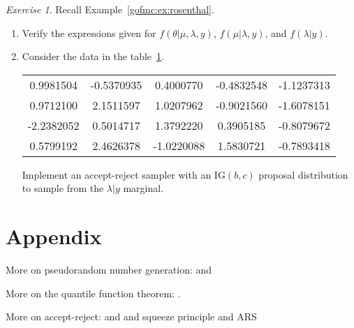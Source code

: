 \documentclass[12pt]{article}
\theoremstyle{plain}
\theoremstyle{definition}
\theoremstyle{remark}
\newtheorem{hw}{Exercise}[section]
\begin{document}
\begin{hw} \label{gofmc:hw:rosenthal}
Recall Example~\ref{gofmc:ex:rosenthal}.  
\begin{enumerate}
\item Verify the expressions given for $f(\theta| \mu, \lambda, y)$,
  $f(\mu | \lambda, y)$, and  
$f(\lambda |y)$. 
\item Consider the data in the table~\ref{gofmc:tab:rosenthal}.
\begin{table}
\begin{center}
\begin{tabular}{ccccc} 
  \hline
0.9981504 & -0.5370935 & 0.4000770 & -0.4832548 & -1.1237313 \\
0.9712100 & 2.1511597 & 1.0207962 & -0.9021560 & -1.6078151 \\
-2.2382052 & 0.5014717 & 1.3792220 & 0.3905185 & -0.8079672 \\
0.5799192 & 2.4626378 & -1.0220088 & 1.5830721 & -0.7893418 \\
  \hline
\end{tabular}
\label{gofmc:tab:rosenthal}
\end{center}
\end{table} 
Implement an accept-reject sampler with an $\text{IG}(b,c)$ proposal
distribution to sample from the $\lambda |y$ marginal.
\end{enumerate}
\end{hw}


\newpage

\section*{Appendix}

More on pseudorandom number generation: \citet{devr:1986} and \citet{fish:1996}

More on the quantile function theorem: \citet{angu:1994}.
 
More on accept-reject:  \citet{caff:boot:davi:2001} and \citet{mart:luen:migu:2012} and squeeze principle and ARS



\end{document}
